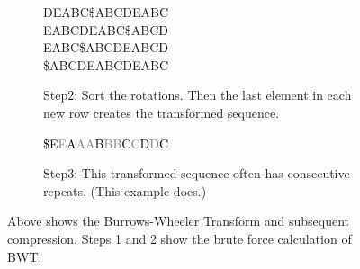\begin{figure}
\begin{subfigure}{.3\linewidth}
{DEABC\$ABCDEAB\textcolor{black}{C}\\
EABCDEABC\$ABC\textcolor{black}{D}\\
EABC\$ABCDEABC\textcolor{black}{D}\\
\$ABCDEABCDEAB\textcolor{black}{C}\\
}
\caption{Step2: Sort the rotations. Then the last element in each new row creates the transformed sequence.}
\label{fig:bwtStep2}
\end{subfigure}
\begin{subfigure}{.3\linewidth}
\footnotesize
\textcolor{gray}{\textcolor{black}{\$E}E\textcolor{black}{A}AA\textcolor{black}{B}BB\textcolor{black}{C}C\textcolor{black}{D}D\textcolor{black}{C}}\\
\caption{Step3: This transformed sequence often has consecutive repeats. (This example does.)}
\label{fig:bwtStep3}
\end{subfigure}
\caption[Burrows Wheeler Transform]{Above shows the Burrows-Wheeler Transform and subsequent compression. Steps 1 and 2 show the brute force calculation of BWT.}
\label{fig:bwt}
\end{figure}
